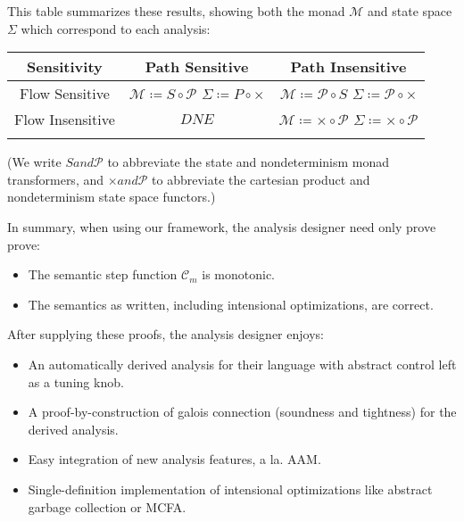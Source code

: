 \documentclass{article}
\begin{document}
This table summarizes these results, showing both the monad $ℳ $ and state space $Σ$ which correspond to each analysis:
\begin{center}\begin{tabular}{| c | c | c |}
  \hline Sensitivity      & Path Sensitive                    & Path Insensitive                  \\
  \hline Flow Sensitive   & $ℳ  ≔ S ∘ 𝒫$ \newline $Σ ≔ P ∘ ×$ & $ℳ  ≔ 𝒫 ∘ S$ \newline $Σ ≔ 𝒫 ∘ ×$ \\
  \hline Flow Insensitive & $DNE$                             & $ℳ  ≔ × ∘ 𝒫$ \newline $Σ ≔ × ∘ 𝒫$ \\
  \hline                                                                                          \\
\end{tabular}\end{center}
(We write $S and 𝒫$ to abbreviate the state and nondeterminism monad
transformers, and $× and 𝒫$ to abbreviate the cartesian product and
nondeterminism state space functors.)

In summary, when using our framework, the analysis designer need only prove prove:
\begin{itemize}
\item The semantic step function $𝒞_{m}$ is monotonic.
\item The semantics as written, including intensional optimizations, are correct.
\end{itemize}
After supplying these proofs, the analysis designer enjoys:
\begin{itemize}
\item An automatically derived analysis for their language with abstract control left as a tuning knob.
\item A proof-by-construction of galois connection (soundness and tightness) for the derived analysis.
\item Easy integration of new analysis features, a la. AAM.
\item Single-definition implementation of intensional optimizations like abstract garbage collection or MCFA.
\end{itemize}


\end{document}

